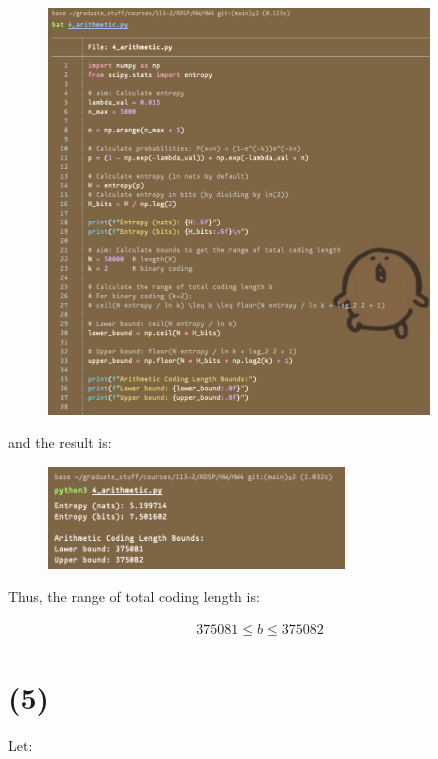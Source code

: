 \documentclass{article}
\begin{document}
\begin{figure}[H]
    \centering
    \includegraphics[width=0.9\textwidth]{HW4_img/4_code_arithmetic.png}
\end{figure}

and the result is:

\begin{figure}[H]
    \centering
    \includegraphics[width=0.7\textwidth]{HW4_img/4_result_arithmetic.png}
\end{figure}

Thus, the range of total coding length is:

\begin{align*}
    375081 \leq b \leq 375082
\end{align*}




\section*{(5)}

Let:
\end{document}
